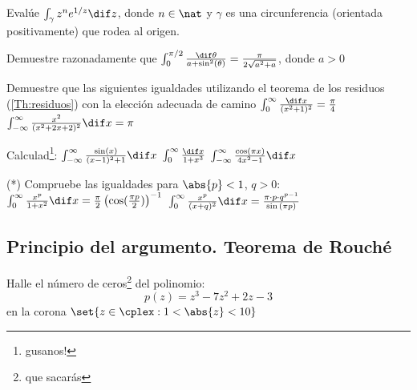 \begin{problem}
Evalúe $\int_{\gamma} z^n e^{1/z} \dif z$, donde $n \in \nat$ y $\gamma$ es una circunferencia (orientada positivamente) que rodea al origen.
\solution

\end{problem}

\begin{problem}
Demuestre razonadamente que $\int_{0}^{\pi / 2} \frac{\dif \theta}{a + \sin^2(\theta)} = \frac{\pi}{2 \sqrt{a^2 + a}}$, donde $a > 0$
\solution

\end{problem}

\begin{problem}
Demuestre que las siguientes igualdades utilizando el teorema de los residuos (\ref{Th:residuos}) con la elección adecuada de camino
\ppart $\int_{0}^{\infty} \frac{\dif x}{(x^2 + 1)^2} = \frac{\pi}{4}$
\ppart $\int_{-\infty}^{\infty} \frac{x^2}{(x^2 + 2x + 2)^2} \dif x = \pi$
\solution

\end{problem}

\begin{problem}
Calculad\footnote{gusanos!}:
\ppart $\int_{-\infty}^{\infty} \frac{\sin(x)}{(x - 1)^2 +1} \dif x$
\ppart $\int_{0}^{\infty} \frac{\dif x}{1 + x^3}$
\ppart $\int_{-\infty}^{\infty} \frac{\cos(\pi x)}{4x^2 - 1} \dif x$
\solution

\end{problem}

\begin{problem}
(*) Compruebe las igualdades para $\abs{p} < 1$, $q > 0$:
\ppart $\int_{0}^{\infty} \frac{x^p}{1 + x^2} \dif x = \frac{\pi}{2} \left( \cos(\frac{\pi p}{2}) \right)^{-1} $
\ppart $\int_{0}^{\infty} \frac{x^p}{(x + q)^2} \dif x = \frac{\pi \cdot p \cdot q^{p-1}}{\sin{(\pi p)}}$
\solution

\end{problem}

\subsection{Principio del argumento. Teorema de Rouché}
\begin{problem}
Halle el número de ceros\footnote{que sacarás} del polinomio:
\[ p(z) = z^3 - 7z^2 + 2z - 3 \]
en la corona $\set{z \in \cplex: 1 < \abs{z} < 10 }$
\solution

\end{problem}

